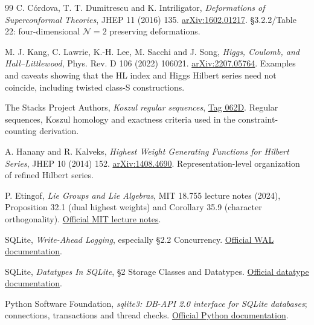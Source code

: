 \documentclass[11pt,a4paper]{article}
\numberwithin{equation}{section}
\begin{document}
\begin{thebibliography}{99}
 C. C\'ordova, T. T. Dumitrescu and K. Intriligator,
\emph{Deformations of Superconformal Theories}, JHEP 11 (2016) 135.
\href{https://arxiv.org/abs/1602.01217}{arXiv:1602.01217}.
\S3.2.2/Table 22: four-dimensional $\mathcal N=2$ preserving deformations.

 M. J. Kang, C. Lawrie, K.-H. Lee, M. Sacchi and J. Song,
\emph{Higgs, Coulomb, and Hall--Littlewood}, Phys. Rev. D 106 (2022) 106021.
\href{https://arxiv.org/abs/2207.05764}{arXiv:2207.05764}.
Examples and caveats showing that the HL index and Higgs Hilbert series need
not coincide, including twisted class-S constructions.

 The Stacks Project Authors, \emph{Koszul regular sequences},
\href{https://stacks.math.columbia.edu/tag/062D}{Tag 062D}.
Regular sequences, Koszul homology and exactness criteria used in the
constraint-counting derivation.

 A. Hanany and R. Kalveks, \emph{Highest Weight Generating
Functions for Hilbert Series}, JHEP 10 (2014) 152.
\href{https://arxiv.org/abs/1408.4690}{arXiv:1408.4690}.
Representation-level organization of refined Hilbert series.

 P. Etingof, \emph{Lie Groups and Lie Algebras}, MIT 18.755
lecture notes (2024), Proposition 32.1 (dual highest weights) and Corollary 35.9
(character orthogonality).
\href{https://ocw.mit.edu/courses/18-755-lie-groups-and-lie-algebras-ii-spring-2024/mit18_755_s24_lec_full.pdf}{Official MIT lecture notes}.

 SQLite, \emph{Write-Ahead Logging}, especially \S2.2
Concurrency. \href{https://www.sqlite.org/wal.html}{Official WAL documentation}.

 SQLite, \emph{Datatypes In SQLite}, \S2 Storage Classes
and Datatypes. \href{https://www.sqlite.org/datatype3.html}{Official datatype documentation}.

 Python Software Foundation, \emph{sqlite3: DB-API 2.0
interface for SQLite databases}; connections, transactions and thread checks.
\href{https://docs.python.org/3/library/sqlite3.html}{Official Python documentation}.
\end{thebibliography}
\end{document}
